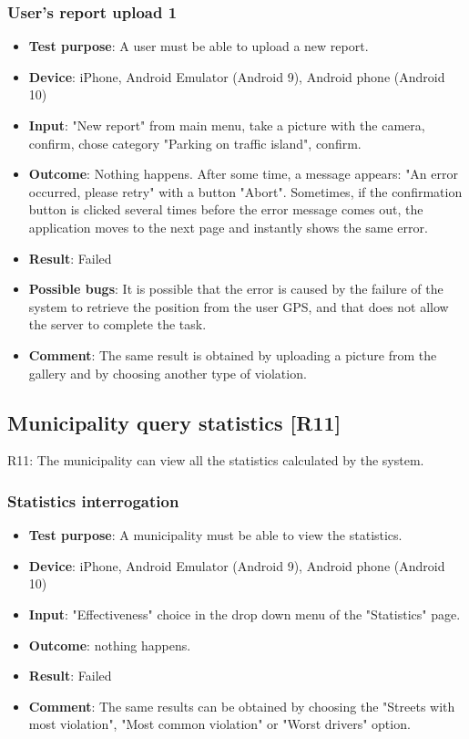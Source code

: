 \documentclass[../ATD.tex]{subfiles}
\begin{document}
    \subsubsection{User's report upload 1}\label{subsubsec:user-report-upload-1}
    \begin{itemize}
        \item \textbf{Test purpose}: A user must be able to upload a new report.
        \item \textbf{Device}: iPhone, Android Emulator (Android 9), Android phone (Android 10)
        \item \textbf{Input}: "New report" from main menu, take a picture with the camera, confirm, chose category "Parking on traffic island", confirm.
        \item \textbf{Outcome}: Nothing happens.
        After some time, a message appears: "An error occurred, please retry" with a button "Abort".
        Sometimes, if the confirmation button is clicked several times before the error message comes out, the application moves to the next page and instantly shows the same error.
        \item \textbf{Result}: Failed
        \item \textbf{Possible bugs}: It is possible that the error is caused by the failure of the system to retrieve the position from the user GPS, and that does not allow the server to complete the task.
        \item \textbf{Comment}: The same result is obtained by uploading a picture from the gallery and by choosing another type of violation.
    \end{itemize}

    \subsection{Municipality query statistics [R11]}\label{subsec:municipality-query-statistics}
    R11: The municipality can view all the statistics calculated by the system.

    \subsubsection{Statistics interrogation}\label{subsubsec:statistics-interrogation}
    \begin{itemize}
        \item \textbf{Test purpose}: A municipality must be able to view the statistics.
        \item \textbf{Device}: iPhone, Android Emulator (Android 9), Android phone (Android 10)
        \item \textbf{Input}: "Effectiveness" choice in the drop down menu of the "Statistics" page.
        \item \textbf{Outcome}: nothing happens.
        \item \textbf{Result}: Failed
        \item \textbf{Comment}: The same results can be obtained by choosing the "Streets with most violation", "Most common violation" or "Worst drivers" option.
    \end{itemize}
\end{document}
